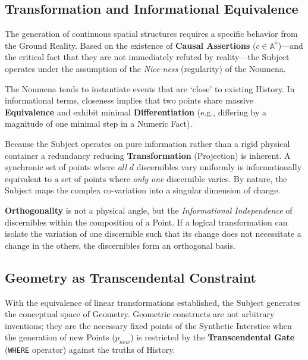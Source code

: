\subsection{Transformation and Informational Equivalence}

The generation of continuous spatial structures requires a specific
behavior from the Ground Reality. Based on the existence of \textbf{Causal
Assertions} ($c \in \mathbb{A}^\diamond$)---and the critical fact that they are
not immediately refuted by reality---the Subject operates under the assumption
of the \textit{Nice-ness} (regularity) of the Noumena. 

The Noumena tends to instantiate events that are `close' to existing History.
In informational terms, closeness implies that two points share massive
\textbf{Equivalence} and exhibit minimal \textbf{Differentiation} (e.g.,
differing by a magnitude of one minimal step in a Numeric Fact).

Because the Subject operates on pure information rather than a rigid physical
container a redundancy reducing \textbf{Transformation} (Projection) is
inherent. A synchronic set of points where \textit{all} $d$ discernibles vary
uniformly is informationally equivalent to a set of points where \textit{only
one} discernible varies. By nature, the Subject maps the complex co-variation into a
singular dimension of change.

\begin{formalism}[Orthogonality]
    \textbf{Orthogonality} is not a physical angle, but the \textit{Informational
    Independence} of discernibles within the composition of a Point. If a logical
    transformation can isolate the variation of one discernible such that its
    change does not necessitate a change in the others, the discernibles form
    an orthogonal basis. 
\end{formalism}

\subsection{Geometry as Transcendental Constraint}

With the equivalence of linear transformations established, the Subject generates
the conceptual space of Geometry. Geometric constructs are not arbitrary
inventions; they are the necessary fixed points of the Synthetic Interstice when
the generation of new Points ($p_{new}$) is restricted by the
\textbf{Transcendental Gate} (\texttt{WHERE} operator) against the truths of
History.


